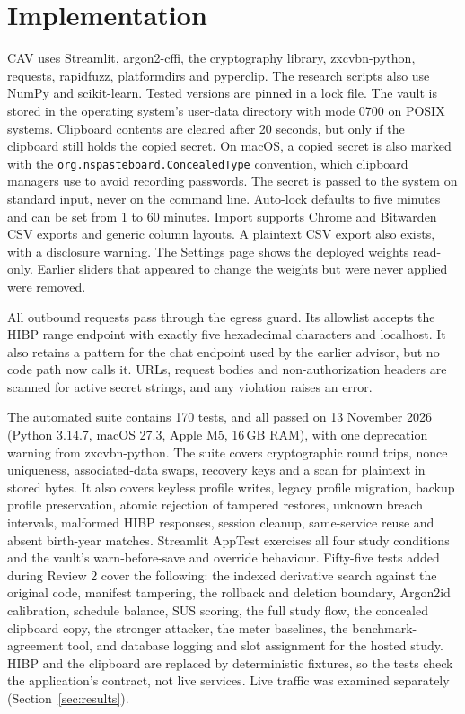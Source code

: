 \documentclass[preprint,12pt]{elsarticle}
\begin{document}
\section{Implementation}
\label{sec:impl}
CAV uses Streamlit, argon2-cffi, the cryptography library, zxcvbn-python, requests, rapidfuzz, platformdirs and pyperclip. The research scripts also use NumPy and scikit-learn. Tested versions are pinned in a lock file. The vault is stored in the operating system's user-data directory with mode 0700 on POSIX systems. Clipboard contents are cleared after 20 seconds, but only if the clipboard still holds the copied secret. On macOS, a copied secret is also marked with the \texttt{org.nspasteboard.ConcealedType} convention, which clipboard managers use to avoid recording passwords. The secret is passed to the system on standard input, never on the command line. Auto-lock defaults to five minutes and can be set from 1 to 60 minutes. Import supports Chrome and Bitwarden CSV exports and generic column layouts. A plaintext CSV export also exists, with a disclosure warning. The Settings page shows the deployed weights read-only. Earlier sliders that appeared to change the weights but were never applied were removed.

All outbound requests pass through the egress guard. Its allowlist accepts the HIBP range endpoint with exactly five hexadecimal characters and localhost. It also retains a pattern for the chat endpoint used by the earlier advisor, but no code path now calls it. URLs, request bodies and non-authorization headers are scanned for active secret strings, and any violation raises an error.

The automated suite contains 170 tests, and all passed on 13 November 2026 (Python 3.14.7, macOS 27.3, Apple M5, 16\,GB RAM), with one deprecation warning from zxcvbn-python. The suite covers cryptographic round trips, nonce uniqueness, associated-data swaps, recovery keys and a scan for plaintext in stored bytes. It also covers keyless profile writes, legacy profile migration, backup profile preservation, atomic rejection of tampered restores, unknown breach intervals, malformed HIBP responses, session cleanup, same-service reuse and absent birth-year matches. Streamlit AppTest exercises all four study conditions and the vault's warn-before-save and override behaviour. Fifty-five tests added during Review 2 cover the following: the indexed derivative search against the original code, manifest tampering, the rollback and deletion boundary, Argon2id calibration, schedule balance, SUS scoring, the full study flow, the concealed clipboard copy, the stronger attacker, the meter baselines, the benchmark-agreement tool, and database logging and slot assignment for the hosted study. HIBP and the clipboard are replaced by deterministic fixtures, so the tests check the application's contract, not live services. Live traffic was examined separately (Section~\ref{sec:results}).
\end{document}
